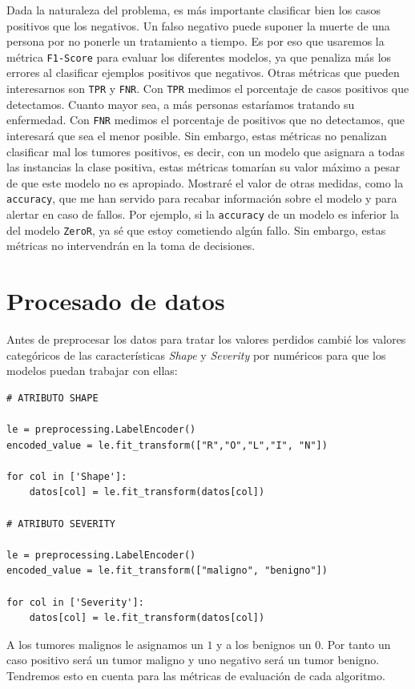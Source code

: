 \documentclass[a4]{article}
\begin{document}
Dada la naturaleza del problema, es más importante clasificar bien los casos positivos que los negativos. Un falso negativo puede suponer la muerte de una persona por no ponerle un tratamiento a tiempo. Es por eso que usaremos la métrica \texttt{F1-Score} para evaluar los diferentes modelos, ya que penaliza más los errores al clasificar ejemplos positivos que negativos. Otras métricas que pueden interesarnos son \texttt{TPR} y \texttt{FNR}. Con \texttt{TPR} medimos el porcentaje de casos positivos que detectamos. Cuanto mayor sea, a más personas estaríamos tratando su enfermedad. Con \texttt{FNR} medimos el porcentaje de positivos que no detectamos, que interesará que sea el menor posible. Sin embargo, estas métricas no penalizan clasificar mal los tumores positivos, es decir, con un modelo que asignara a todas las instancias la clase positiva, estas métricas tomarían su valor máximo a pesar de que este modelo no es apropiado. Mostraré el valor de otras medidas, como la \texttt{accuracy}, que me han servido para recabar información sobre el modelo y para alertar en caso de fallos. Por ejemplo, si la \texttt{accuracy} de un modelo es inferior la del modelo \texttt{ZeroR}, ya sé que estoy cometiendo algún fallo. Sin embargo, estas métricas no intervendrán en la toma de decisiones.

\section{Procesado de datos}

Antes de preprocesar los datos para tratar los valores perdidos cambié los valores categóricos de las características \textit{Shape} y \textit{Severity} por numéricos para que los modelos puedan trabajar con ellas:

\begin{lstlisting}
# ATRIBUTO SHAPE
  
le = preprocessing.LabelEncoder()
encoded_value = le.fit_transform(["R","O","L","I", "N"])

for col in ['Shape']:
    datos[col] = le.fit_transform(datos[col])

# ATRIBUTO SEVERITY
    
le = preprocessing.LabelEncoder()
encoded_value = le.fit_transform(["maligno", "benigno"])

for col in ['Severity']:
    datos[col] = le.fit_transform(datos[col])
  \end{lstlisting}

  A los tumores malignos le asignamos un $1$ y a los benignos un $0$. Por tanto un caso positivo será un tumor maligno y uno negativo será un tumor benigno. Tendremos esto en cuenta para las métricas de evaluación de cada algoritmo.
\end{document}

